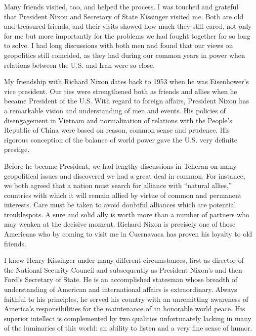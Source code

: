 Many friends visited, too, and helped the process. I was touched and grateful that President Nixon and Secretary of State Kissinger visited me. Both are old and treasured friends, and their visits showed how much they still cared, not only for me but more importantly for the problems we had fought together for so long to solve. I had long discussions with both men and found that our views on geopolitics still coincided, as they had during our common years in power when relations between the U.S. and Iran were so close. 

My friendship with Richard Nixon dates back to 1953 when he was Eisenhower's vice president. Our ties were strengthened both as friends and allies when he became President of the U.S. With regard to foreign affairs, President Nixon has a remarkable vision and understanding of men and events. His policies of disengagement in Vietnam and normalization of relations with the People’s Republic of China were based on reason, common sense and prudence. His rigorous conception of the balance of world power gave the U.S. very definite prestige. 

Before he became President, we had lengthy discussions in Teheran on many geopolitical issues and discovered we had a great deal in common. For instance, we both agreed that a nation must search for alliance with “natural allies,” countries with which it will remain allied by virtue of common and permanent interests. Care must be taken to avoid doubtful alliances which are potential troublespots. A sure and solid ally is worth more than a number of partners who may weaken at the decisive moment. Richard Nixon is precisely one of those Americans who by coming to visit me in Cuernavaca has proven his loyalty to old friends. 

I knew Henry Kissinger under many different circumstances, first as director of the National Security Council and subsequently as President Nixon's and then Ford's Secretary of State. He is an accomplished statesman whose breadth of understanding of American and international affairs is extraordinary. Always faithful to his principles, he served his country with an unremitting awareness of America’s responsibilities for the maintenance of an honorable world peace. His superior intellect is complemented by two qualities unfortunately lacking in many of the luminaries of this world: an ability to listen and a very fine sense of humor. 

